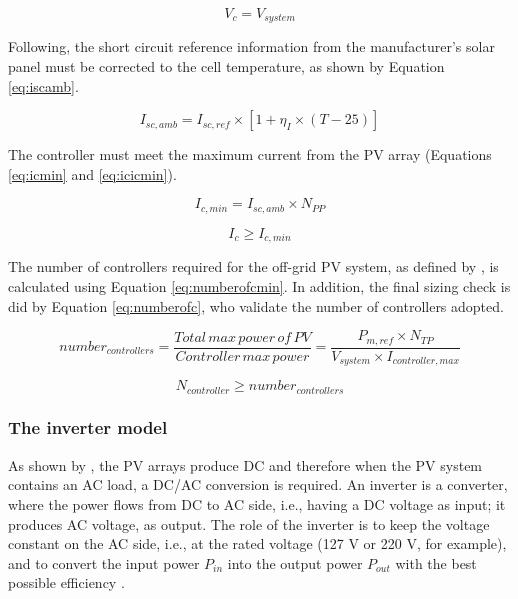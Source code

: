 \begin{equation}
\label{eq:vcvsystem}
V_{c} = V_{system}
\end{equation}

Following, the short circuit reference information from the manufacturer's solar panel must be corrected to the cell temperature, as shown by Equation \ref{eq:iscamb}.

\begin{equation}
\label{eq:iscamb}
I_{sc,amb} = I_{sc,ref} \times \left[ 1 + \eta_{I} \times (T-25) \right] 
\end{equation}

The controller must meet the maximum current from the PV array (Equations \ref{eq:icmin} and \ref{eq:icicmin}).

\begin{equation}
\label{eq:icmin}
I_{c,min} = I_{sc,amb} \times N_{PP}
\end{equation}

\begin{equation}
\label{eq:icicmin}
I_{c} \geq I_{c,min}
\end{equation}

The number of controllers required for the off-grid PV system, as defined by \cite{Yatimi}, is calculated using Equation \ref{eq:numberofcmin}. In addition, the final sizing check is did by Equation \ref{eq:numberofc}, who validate the number of controllers adopted.

\begin{equation}
\label{eq:numberofcmin}
number_{controllers} = \dfrac{Total \, max \, power \, of \, PV}{Controller \, max \, power} =  \dfrac{P_{m,ref} \times N_{TP}}{V_{system} \times I_{controller,max}}
\end{equation}

\begin{equation}
\label{eq:numberofc}
N_{controller} \geq number_{controllers}
\end{equation}

\subsubsection{The inverter model}
As shown by \cite{Mellit}, the PV arrays produce DC and therefore when the PV system contains an AC load, a DC/AC conversion is required. An inverter is a converter, where the power flows from DC to AC side, i.e., having a DC voltage as input; it produces AC voltage, as output. The role of the inverter is to keep the voltage constant on the AC side, i.e., at the rated voltage (127 V or 220 V, for example), and to convert the input power $ P_{in} $ into the output power $ P_{out} $ with the best possible efficiency \cite{Hansen}.

